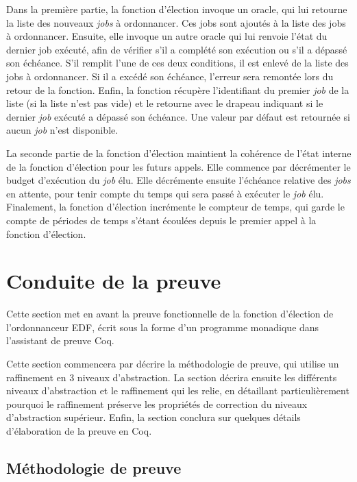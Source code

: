 		Dans la première partie, la fonction d'élection invoque un oracle, qui lui retourne la liste des nouveaux \emph{jobs} à ordonnancer. Ces jobs sont ajoutés à la liste des jobs à ordonnancer. Ensuite, elle invoque un autre oracle qui lui renvoie l'état du dernier job exécuté, afin de vérifier s'il a complété son exécution ou s'il a dépassé son échéance. S'il remplit l'une de ces deux conditions, il est enlevé de la liste des jobs à ordonnancer. Si il a excédé son échéance, l'erreur sera remontée lors du retour de la fonction. Enfin, la fonction récupère l'identifiant du premier \emph{job} de la liste (si la liste n'est pas vide) et le retourne avec le drapeau indiquant si le dernier \emph{job} exécuté a dépassé son échéance. Une valeur par défaut est retournée si aucun \emph{job} n'est disponible.

		La seconde partie de la fonction d'élection maintient la cohérence de l'état interne de la fonction d'élection pour les futurs appels. Elle commence par décrémenter le budget d'exécution du \emph{job} élu. Elle décrémente ensuite l'échéance relative des \emph{jobs} en attente, pour tenir compte du temps qui sera passé à exécuter le \emph{job} élu. Finalement, la fonction d'élection incrémente le compteur de temps, qui garde le compte de périodes de temps s'étant écoulées depuis le premier appel à la fonction d'élection.

	\section{Conduite de la preuve}

	\label{sec:proof}
	Cette section met en avant la preuve fonctionnelle de la fonction d'élection de l'ordonnanceur EDF, écrit sous la forme d'un programme monadique dans l'assistant de preuve Coq.

	Cette section commencera par décrire la méthodologie de preuve, qui utilise un raffinement en 3 niveaux d'abstraction. La section décrira ensuite les différents niveaux d'abstraction et le raffinement qui les relie, en détaillant particulièrement pourquoi le raffinement préserve les propriétés de correction du niveaux d'abstraction supérieur. Enfin, la section conclura sur quelques détails d'élaboration de la preuve en Coq.

	\subsection{Méthodologie de preuve}

